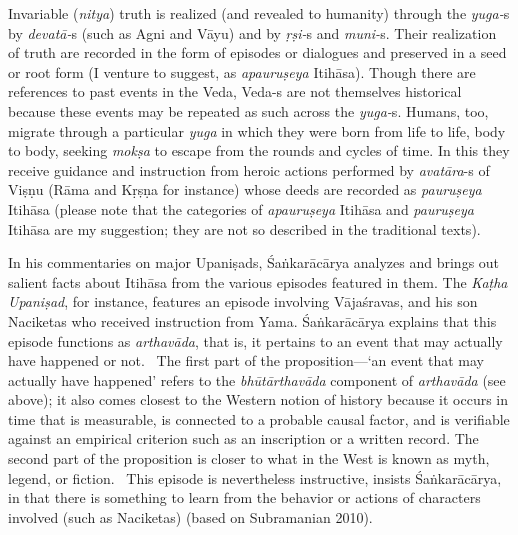 Invariable (\textit{nitya}) truth is realized (and revealed to humanity) through the \textit{yuga-}s by \textit{devatā-}s (such as Agni and Vāyu) and by \textit{ṛṣi-}s and \hbox{\textit{muni-}s}. Their realization of truth are recorded in the form of episodes or dialogues and preserved in a seed or root form (I venture to suggest, as \textit{apauruṣeya} Itihāsa). Though there are references to past events in the Veda, Veda-s are not themselves historical because these events may be repeated as such across the \textit{yuga-}s. Humans, too, migrate through a particular \textit{yuga} in which they were born from life to life, body to body, seeking \textit{mokṣa} to escape from the rounds and cycles of time. In this they receive guidance and instruction from heroic actions performed by \textit{avatāra}-s of Viṣṇu (Rāma and Kṛṣṇa for instance) whose deeds are recorded as \textit{pauruṣeya} Itihāsa (please note that the categories of \textit{apauruṣeya} Itihāsa and \textit{pauruṣeya} Itihāsa are my suggestion; they are not so described in the traditional texts).

In his commentaries on major Upaniṣads, Śaṅkarācārya analyzes and brings out salient facts about Itihāsa from the various episodes featured in them. The \textit{Kaṭha Upaniṣad}, for instance, features an episode involving Vājaśravas, and his son Naciketas who received instruction from Yama. Śaṅkarācārya explains that this episode functions as \textit{arthavāda}, that is, it pertains to an event that may actually have happened or not.  The first part of the proposition—‘an event that may actually have happened’ refers to the \textit{bhūtārthavāda} component of \textit{arthavāda} (see above); it also comes closest to the Western notion of history because it occurs in time that is measurable, is connected to a probable causal factor, and is verifiable against an empirical criterion such as an inscription or a written record. The second part of the proposition is closer to what in the West is known as myth, legend, or fiction.  This episode is nevertheless instructive, insists Śaṅkarācārya, in that there is something to learn from the behavior or actions of characters involved (such as Naciketas) (based on Subramanian 2010). 

